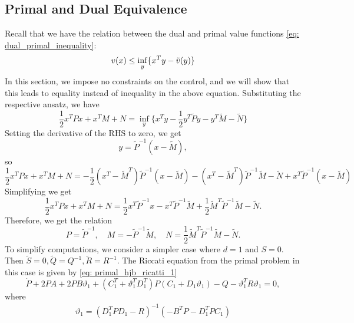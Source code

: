 \newpage 
\subsection{Primal and Dual Equivalence}\label{Primal and Dual Equivalence}
Recall that we have the relation between the dual and primal value functions \eqref{eq: dual_primal_inequality}:
\begin{equation*}
    v(x) \le \inf_y \{x^T y - \Tilde{v}(y)  \}
\end{equation*}
In this section, we impose no constraints on the control, and we will show that this leads to equality instead of inequality in the above equation. Substituting the respective ansatz, we have
\begin{equation*}
    \frac12 x^T P x + x^T M + N = \inf_y \bigg\{ x^T y - \frac12 y^T \tilde{P} y - y^T \tilde{M} - \tilde{N}  \bigg\}
\end{equation*}
Setting the derivative of the RHS to zero, we get 
\begin{equation*}
    y = \tilde{P}^{-1}(x - \tilde{M}),
\end{equation*}
so
\begin{equation*}
    \frac12 x^T P x + x^T M + N  = - \frac12 (x^T - \tilde{M}^T)\tilde{P}^{-1} (x-\tilde{M}) - (x^T - \tilde{M}^T)\tilde{P}^{-1} \tilde{M} - \tilde{N} + x^T \tilde{P}^{-1}(x - \tilde{M})
\end{equation*}
Simplifying we get
\begin{equation*}
    \frac12 x^T P x + x^T M + N = \frac12 x^T \tilde{P}^{-1}x - x^T \tilde{P}^{-1}\tilde{M} + \frac12 \tilde{M}^T \tilde{P}^{-1} \tilde{M} - \tilde{N}.
\end{equation*}
Therefore, we get the relation
\begin{equation*}
    P = \tilde{P}^{-1}, \quad M = -\tilde{P}^{-1} \tilde{M}, \quad N =  \frac12 \tilde{M}^T \tilde{P}^{-1} \tilde{M} - \tilde{N}.
\end{equation*}
To simplify computations, we consider a simpler case where $d=1$ and $S = 0$. Then $\tilde{S}=0, \tilde{Q}= Q^{-1}, \tilde{R} = R^{-1}$.
The Riccati equation from the primal problem in this case is given by \eqref{eq: primal_hjb_ricatti_1}
\begin{equation*}
     \dot{P}  +  2P A + 2P B \vartheta_1 + (C_1^T + \vartheta_1^T D_1^T)P(C_1 + D_1 \vartheta_1) 
     -  Q -  \vartheta_1^T R \vartheta_1 = 0,
\end{equation*}
where 
\begin{align*}
    \vartheta_1 = ( D_1^T  P D_1 - R)^{-1} ( - B^T  P - D_1^T  P C_1 )
\end{align*}
